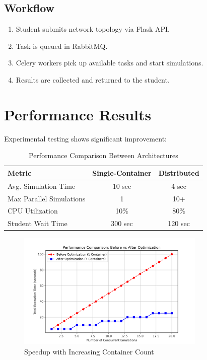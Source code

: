 \documentclass[14pt]{article}
\begin{document}
\subsection{Workflow}
\begin{enumerate}
    \item Student submits network topology via Flask API.
    \item Task is queued in RabbitMQ\cite{rabbitmq}.
    \item Celery\cite{celery} workers pick up available tasks and start simulations.
    \item Results are collected and returned to the student.
\end{enumerate}


\section{Performance Results}
Experimental testing shows significant improvement:
\begin{table}[h]
    \centering
    \begin{tabular}{lcc}
        \toprule
        Metric & Single-Container & Distributed \\ \midrule
        Avg. Simulation Time & 10 sec & 4 sec \\
        Max Parallel Simulations & 1 & 10+ \\
        CPU Utilization & 10\% & 80\% \\
        Student Wait Time & 300 sec & 120 sec \\
        \bottomrule
    \end{tabular}
    \caption{Performance Comparison Between Architectures}
\end{table}

\begin{figure}[h!]
\centering
\includegraphics[width=0.8\textwidth]{performance_comparison.png}
\caption{Speedup with Increasing Container Count}
\end{figure}
\end{document}
